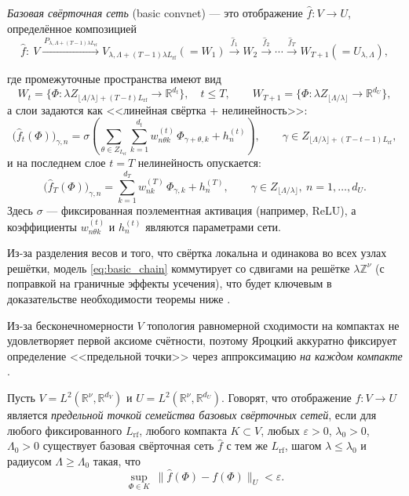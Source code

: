 \documentclass[../NDCNNAI_main.tex]{subfiles}
\begin{document}
\begin{definition}
  \emph{Базовая свёрточная сеть} (basic convnet) --- это отображение $\hat f\colon V\to U$, определённое композицией
\begin{equation}
  \hat f\colon \ V \xrightarrow{\,P_{\lambda,\Lambda+(T-1)\lambda L_{\mathrm{rf}}}\,}
V_{\lambda,\Lambda+(T-1)\lambda L_{\mathrm{rf}}}(=W_1)
\xrightarrow{\ \hat f_1\ } W_2 \xrightarrow{\ \hat f_2\ }\cdots
\xrightarrow{\ \hat f_T\ } W_{T+1}(=U_{\lambda,\Lambda}),
\label{eq:basic_chain}  
\end{equation}

где промежуточные пространства имеют вид
\[
W_t=\Big\{\Phi:\lambda Z_{\lfloor \Lambda/\lambda\rfloor+(T-t)L_{\mathrm{rf}}}\to \mathbb{R}^{d_t}\Big\},
\quad t\le T,
\qquad
W_{T+1}=\Big\{\Phi:\lambda Z_{\lfloor \Lambda/\lambda\rfloor}\to \mathbb{R}^{d_U}\Big\},
\]
а слои задаются как <<линейная свёртка + нелинейность>>:
\[
\big(\hat f_t(\Phi)\big)_{\gamma,n}
=
\sigma\!\left(\sum_{\theta\in Z_{L_{\mathrm{rf}}}}\sum_{k=1}^{d_t}
w^{(t)}_{n\theta k}\,\Phi_{\gamma+\theta,k}+h^{(t)}_n\right),
\qquad
\gamma\in Z_{\lfloor \Lambda/\lambda\rfloor+(T-t-1)L_{\mathrm{rf}}},
\]
и на последнем слое $t=T$ нелинейность опускается:
\[
\big(\hat f_T(\Phi)\big)_{\gamma,n}
=
\sum_{k=1}^{d_T} w^{(T)}_{nk}\,\Phi_{\gamma,k}+h^{(T)}_n,
\qquad
\gamma\in Z_{\lfloor \Lambda/\lambda\rfloor},\ n=1,\dots,d_U.
\]
Здесь $\sigma$ --- фиксированная поэлементная активация (например, ReLU), а коэффициенты $w^{(t)}_{n\theta k}$ и $h^{(t)}_n$
являются параметрами сети.
\end{definition}

Из-за разделения весов и того, что свёртка локальна и одинакова во всех узлах решётки, модель \eqref{eq:basic_chain} коммутирует со сдвигами на решётке $\lambda\mathbb{Z}^\nu$
(с поправкой на граничные эффекты усечения), что будет ключевым в доказательстве необходимости теоремы ниже \cite{Yarotsky2018}.

Из-за бесконечномерности $V$ топология равномерной сходимости на компактах не удовлетворяет первой аксиоме счётности,
поэтому Яроцкий аккуратно фиксирует определение <<предельной точки>> через аппроксимацию \emph{на каждом компакте} \cite{Yarotsky2018}.

\begin{definition}
Пусть $V=L^2(\mathbb{R}^\nu,\mathbb{R}^{d_V})$ и $U=L^2(\mathbb{R}^\nu,\mathbb{R}^{d_U})$.
Говорят, что отображение $f:V\to U$ является \emph{предельной точкой семейства базовых свёрточных сетей},
если для любого фиксированного $L_{\mathrm{rf}}$, любого компакта $K\subset V$, любых $\varepsilon>0$, $\lambda_0>0$, $\Lambda_0>0$
существует базовая свёрточная сеть $\hat f$ с тем же $L_{\mathrm{rf}}$, шагом $\lambda\le \lambda_0$ и радиусом $\Lambda\ge \Lambda_0$ такая, что
\[
\sup_{\Phi\in K}\ \|\hat f(\Phi)-f(\Phi)\|_U<\varepsilon.
\]  
\end{definition}
\end{document}
